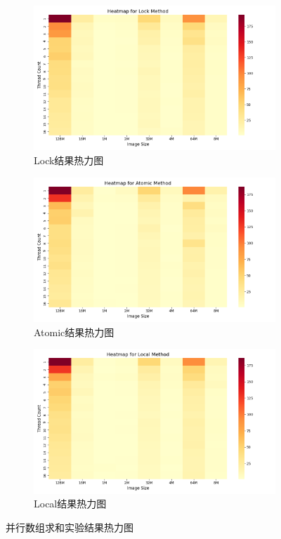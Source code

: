 \documentclass[a4paper, utf8]{ctexart}
\begin{document}
	\begin{figure}
		\centering
		\begin{subfigure}{.32\textwidth}
			\centering
			\includegraphics[width=.9\textwidth]{./figure/result2-Lock.png}
			\caption{Lock结果热力图}
		\end{subfigure}
		\begin{subfigure}{.32\textwidth}
			\centering
			\includegraphics[width=.9\textwidth]{./figure/result2-Atomic.png}
			\caption{Atomic结果热力图}
		\end{subfigure}
		\begin{subfigure}{.32\textwidth}
			\centering
			\includegraphics[width=.9\textwidth]{./figure/result2-Local.png}
			\caption{Local结果热力图}
		\end{subfigure}
		\caption{并行数组求和实验结果热力图}
	\end{figure}
	
\end{document}
